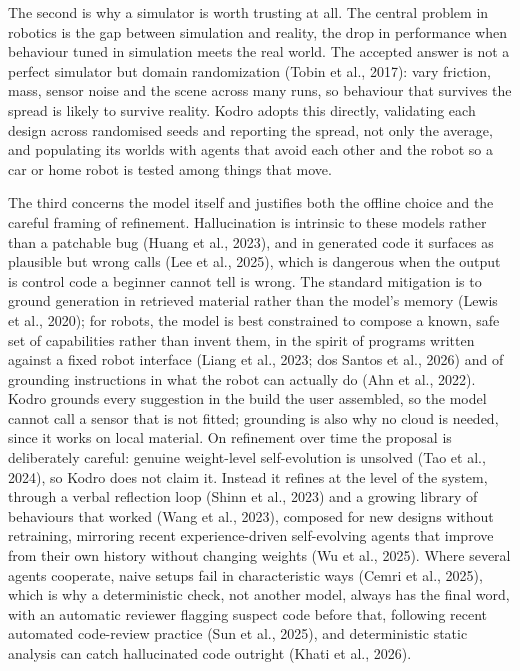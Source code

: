 \documentclass[10.5pt]{article}
\begin{document}
The second is why a simulator is worth trusting at all. The central problem in robotics is the gap between simulation and reality, the drop in performance when behaviour tuned in simulation meets the real world. The accepted answer is not a perfect simulator but domain randomization (Tobin et al., 2017): vary friction, mass, sensor noise and the scene across many runs, so behaviour that survives the spread is likely to survive reality. Kodro adopts this directly, validating each design across randomised seeds and reporting the spread, not only the average, and populating its worlds with agents that avoid each other and the robot so a car or home robot is tested among things that move.

The third concerns the model itself and justifies both the offline choice and the careful framing of refinement. Hallucination is intrinsic to these models rather than a patchable bug (Huang et al., 2023), and in generated code it surfaces as plausible but wrong calls (Lee et al., 2025), which is dangerous when the output is control code a beginner cannot tell is wrong. The standard mitigation is to ground generation in retrieved material rather than the model's memory (Lewis et al., 2020); for robots, the model is best constrained to compose a known, safe set of capabilities rather than invent them, in the spirit of programs written against a fixed robot interface (Liang et al., 2023; dos Santos et al., 2026) and of grounding instructions in what the robot can actually do (Ahn et al., 2022). Kodro grounds every suggestion in the build the user assembled, so the model cannot call a sensor that is not fitted; grounding is also why no cloud is needed, since it works on local material. On refinement over time the proposal is deliberately careful: genuine weight-level self-evolution is unsolved (Tao et al., 2024), so Kodro does not claim it. Instead it refines at the level of the system, through a verbal reflection loop (Shinn et al., 2023) and a growing library of behaviours that worked (Wang et al., 2023), composed for new designs without retraining, mirroring recent experience-driven self-evolving agents that improve from their own history without changing weights (Wu et al., 2025). Where several agents cooperate, naive setups fail in characteristic ways (Cemri et al., 2025), which is why a deterministic check, not another model, always has the final word, with an automatic reviewer flagging suspect code before that, following recent automated code-review practice (Sun et al., 2025), and deterministic static analysis can catch hallucinated code outright (Khati et al., 2026).
\end{document}
